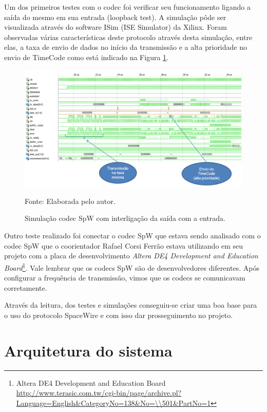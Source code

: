 Um dos primeiros testes com o codec foi verificar seu funcionamento ligando a saída do mesmo em sua entrada (loopback test). A simulação pôde ser visualizada através do software ISim (ISE Simulator) da Xilinx. Foram observadas várias características deste protocolo através desta simulação, entre elas, a taxa de envio de dados no início da transmissão e a alta prioridade no envio de TimeCode como está indicado na Figura \ref{SimulSpW_1}.

\begin{figure}[!htb]
	\centering
	\caption{Simulação codec SpW com interligação da saída com a entrada.}
	\includegraphics[scale = 0.7, angle = 90]{Imagens/SimulSpW_1}
	
	Fonte: Elaborada pelo autor.
	
	\label{SimulSpW_1}
\end{figure}

Outro teste realizado foi conectar o codec SpW que estava sendo analisado com o codec SpW que o coorientador Rafael Corsi Ferrão estava utilizando em seu projeto com a placa de desenvolvimento \textit{Altera DE4 Development and Education Board}\footnote{Altera DE4 Development and Education Board \url{http://www.terasic.com.tw/cgi-bin/page/archive.pl?Language=English\&CategoryNo=138\&No=\\501\&PartNo=1}}. Vale lembrar que os codecs SpW são de desenvolvedores diferentes. Após configurar a frequência de transmissão, vimos que os codecs se comunicavam corretamente.

Através da leitura, dos testes e simulações conseguiu-se criar uma boa base para o uso do protocolo SpaceWire e com isso dar prosseguimento no projeto.

\section{Arquitetura do sistema}

